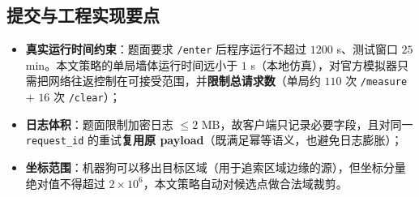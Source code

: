 \subsection{提交与工程实现要点}

\begin{itemize}
  \item \textbf{真实运行时间约束}：题面要求 \texttt{/enter} 后程序运行不超过 $1200$ s、测试窗口 $25$ min。本文策略的单局墙体运行时间远小于 $1$ s（本地仿真），对官方模拟器只需把网络往返控制在可接受范围，并\textbf{限制总请求数}（单局约 $110$ 次 \texttt{/measure} $+$ $16$ 次 \texttt{/clear}）；
  \item \textbf{日志体积}：题面限制加密日志 $\le2$ MB，故客户端只记录必要字段，且对同一 \texttt{request\_id} 的重试\textbf{复用原 payload}（既满足幂等语义，也避免日志膨胀）；
  \item \textbf{坐标范围}：机器狗可以移出目标区域（用于追索区域边缘的源），但坐标分量绝对值不得超过 $2\times10^6$，本文策略自动对候选点做合法域裁剪。
\end{itemize}
